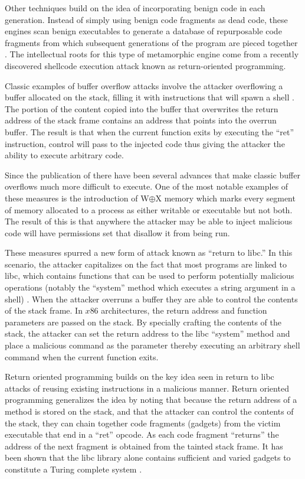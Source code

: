     Other techniques build on the idea of incorporating benign code in each
    generation. Instead of simply using benign code fragments as dead code,
    these engines scan benign executables to generate a database of repurposable
    code fragments from which subsequent generations of the program are pieced
    together \cite{franken}. The intellectual roots for this type of metamorphic
    engine come from a recently discovered shellcode execution attack known as
    return-oriented programming.

    Classic examples of buffer overflow attacks involve the attacker overflowing
    a buffer allocated on the stack, filling it with instructions that will
    spawn a shell \cite{aleph}. The portion of the content copied into the
    buffer that overwrites the return address of the stack frame contains an
    address that points into the overrun buffer. The result is that when the
    current function exits by executing the ``ret'' instruction, control will
    pass to the injected code thus giving the attacker the ability to execute
    arbitrary code.

    Since the publication of \cite{aleph} there have been several advances that
    make classic buffer overflows much more difficult to execute. One of the
    most notable examples of these measures is the introduction of W$\oplus$X
    memory which marks every segment of memory allocated to a process as either
    writable or executable but not both. The result of this is that anywhere the
    attacker may be able to inject malicious code will have permissions set that
    disallow it from being run.

    These measures spurred a new form of attack known as ``return to libc.'' In
    this scenario, the attacker capitalizes on the fact that most programs are
    linked to libc, which contains functions that can be used to perform
    potentially malicious operations (notably the ``system'' method which
    executes a string argument in a shell) \cite{rop_geo}. When the attacker
    overruns a buffer they are able to control the contents of the stack frame.
    In $x86$ architectures, the return address and function parameters are
    passed on the stack. By specially crafting the contents of the stack, the
    attacker can set the return address to the libc ``system'' method and place
    a malicious command as the parameter thereby executing an arbitrary shell
    command when the current function exits.

    Return oriented programming builds on the key idea seen in return to libc
    attacks of reusing existing instructions in a malicious manner. Return
    oriented programming generalizes the idea by noting that because the return
    address of a method is stored on the stack, and that the attacker can
    control the contents of the stack, they can chain together code fragments
    (gadgets) from the victim executable that end in a ``ret'' opcode. As each
    code fragment ``returns'' the address of the next fragment is obtained from
    the tainted stack frame. It has been shown that the libc library alone
    contains sufficient and varied gadgets to constitute a Turing complete
    system \cite{rop_geo}.

